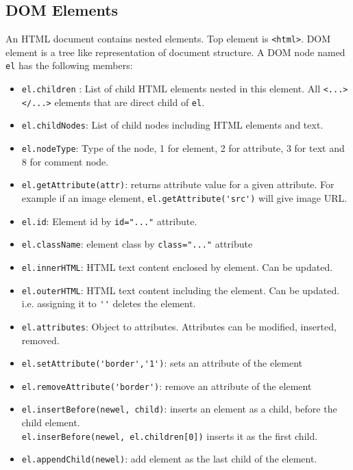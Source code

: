 \documentclass[trans,compress,xcolor=table]{beamer}
\begin{document}
\subsection*{DOM Elements}
\begin{frame}[fragile]
An HTML document contains nested elements. Top element is
\lstinline!<html>!. DOM element is a tree like representation
of document structure.
A DOM node named \lstinline!el! has the following members:
\begin{itemize}
\item \lstinline!el.children! : List of child HTML elements
	nested in this element. All \lstinline!<...></...>! elements
	that are direct child of \lstinline!el!.
\item \lstinline!el.childNodes!: List of child nodes including
	HTML elements and text.
\item \lstinline!el.nodeType!: Type of the node, 1 for element, 2 for attribute, 3 for text and 8 for comment node.
\item \lstinline!el.getAttribute(attr)!: returns attribute value for a
	given attribute. For example if an image element, \lstinline!el.getAttribute('src')! will give image URL.
\item \lstinline!el.id!: Element id by \lstinline!id="..."! attribute.
\item \lstinline!el.className!: element class by \lstinline!class="..."! attribute
\end{itemize}
\end{frame}

\begin{frame}[fragile]
\begin{itemize}
\item \lstinline!el.innerHTML!: HTML text content enclosed
	by element. Can be updated.
\item \lstinline!el.outerHTML!: HTML text content including
	the element. Can be updated. i.e. assigning it to \lstinline!''!
	deletes the element.
\item \lstinline!el.attributes!: Object to attributes. Attributes
	can be modified, inserted, removed.
\item \lstinline!el.setAttribute('border','1')!:
	sets an attribute of the element \\
\item \lstinline!el.removeAttribute('border')!:
	remove an attribute of the element \\
\item \lstinline!el.insertBefore(newel, child)!: 
	inserts an element as a child, before the child element.\\
	\lstinline!el.inserBefore(newel, el.children[0])! inserts
	it as the first child.
\item \lstinline!el.appendChild(newel)!:
	add element as the last child of the element.
\end{itemize}
\end{frame}
\end{document}
